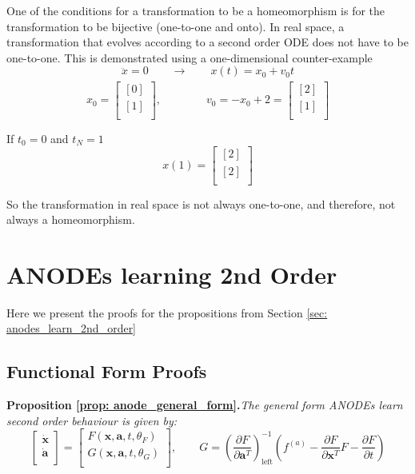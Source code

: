 \documentclass{article}
\theoremstyle{remark}
\theoremstyle{definition}
\begin{document}
One of the conditions for a transformation to be a homeomorphism is for the transformation to be bijective (one-to-one and onto). In real space, a transformation that evolves according to a second order ODE does not have to be one-to-one. This is demonstrated using a one-dimensional counter-example
\[
\ddot{x} = 0
\qquad
\xrightarrow[]{}
\qquad
x(t) = x_{0} + v_{0}t
\]
\[
x_{0} = \begin{bmatrix}
        [0] \\
        [1] \\
    \end{bmatrix}
,\qquad\qquad
v_{0} = -x_{0} + 2 = \begin{bmatrix}
        [2]\\
        [1]\\
\end{bmatrix}
\]

If $t_{0} = 0$ and $t_{N}=1$
\[
x(1) = \begin{bmatrix}
        [2] \\
        [2] \\
    \end{bmatrix}
\]

So the transformation in real space is not always one-to-one, and therefore, not always a homeomorphism. 

\section{ANODEs learning 2nd Order}
\label{app: anode_learn_second_order}

Here we present the proofs for the propositions from Section \ref{sec: anodes_learn_2nd_order}

\subsection{Functional Form Proofs}


\textbf{Proposition \ref{prop: anode_general_form}.}\textit{The general form ANODEs learn second order behaviour is given by:
\begin{equation}
\begin{bmatrix}
\dot{\mathbf{x}}\\
\dot{\mathbf{a}}\\
\end{bmatrix}
=
\begin{bmatrix}
F(\mathbf{x},\mathbf{a},t,\theta_{F})\\
G(\mathbf{x},\mathbf{a},t,\theta_{G})\\
\end{bmatrix},
\qquad
G = \left( \frac{\partial F}{\partial \mathbf{a}^{T}}\right)_{\text{left}}^{-1}
\left(
f^{(a)} - \frac{\partial F}{\partial \mathbf{x}^{T}}F - 
\frac{\partial F}{\partial t}
\right)
\end{equation}}
\end{document}

